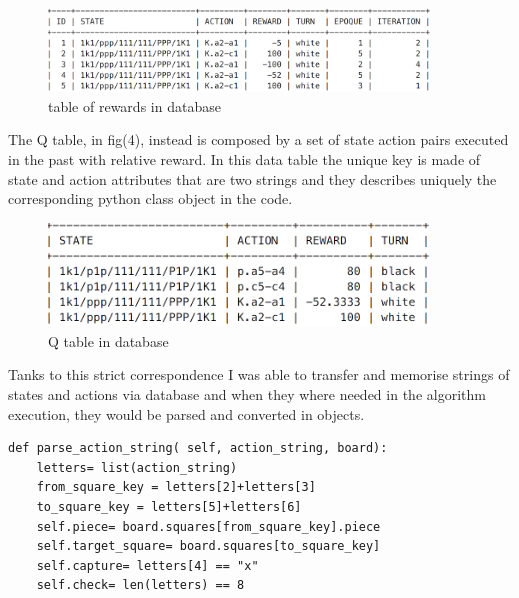 \documentclass{article}
\begin{document}
\begin{center}
\begin{figure}[h]
\centering
\includegraphics[width=0.9\textwidth]{r_table}
\caption{table of rewards in database}
\label{fig:3}
\end{figure}
\end{center}



				The Q table, in fig(4), instead is composed by a set of state action pairs executed in the past with relative reward. In this data table the unique key is made of state and action attributes that are two strings and they describes uniquely the corresponding python class object in the code.\medskip\\
\begin{center}
\begin{figure}[h]
\centering
\includegraphics[width=0.9\textwidth]{q_table}
\caption{Q table in database}
\label{fig:4}
\end{figure}
\end{center}
\newpage
				Tanks to this strict correspondence I was able to transfer and memorise strings of states and actions via database and when they where needed in the algorithm execution, they would be parsed and converted in objects.\medskip\\

\begin{lstlisting}[caption=from string to class object, label=exepred]
def parse_action_string( self, action_string, board):
	letters= list(action_string)
	from_square_key = letters[2]+letters[3]
	to_square_key = letters[5]+letters[6]
	self.piece= board.squares[from_square_key].piece
	self.target_square= board.squares[to_square_key]
	self.capture= letters[4] == "x"
	self.check= len(letters) == 8
\end{lstlisting}
\end{document}
